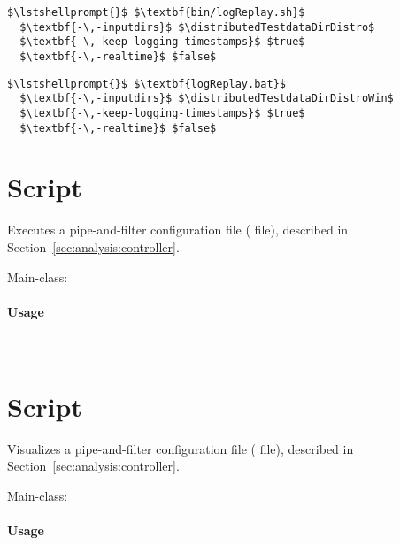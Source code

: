 
\setTextListing
\begin{lstlisting}[caption=Execution under UNIX-like systems]
$\lstshellprompt{}$ $\textbf{bin/logReplay.sh}$
  $\textbf{-\,-inputdirs}$ $\distributedTestdataDirDistro$ 
  $\textbf{-\,-keep-logging-timestamps}$ $true$ 
  $\textbf{-\,-realtime}$ $false$
\end{lstlisting}
\begin{lstlisting}[caption=Execution under Windows]
$\lstshellprompt{}$ $\textbf{logReplay.bat}$
  $\textbf{-\,-inputdirs}$ $\distributedTestdataDirDistroWin$ 
  $\textbf{-\,-keep-logging-timestamps}$ $true$ 
  $\textbf{-\,-realtime}$ $false$
\end{lstlisting}


\section{Script }\label{appendix:wrapperScripts:kaxRun}

Executes a \KickerAnalysisPart{} pipe-and-filter configuration file ( file), %
described in Section~\ref{sec:analysis:controller}. %

\noindent Main-class: {\small {}}

\paragraph*{Usage}\

\setTextListing


\section{Script }\label{appendix:wrapperScripts:kaxViz}

Visualizes a \KickerAnalysisPart{} pipe-and-filter configuration file ( file), %
described in Section~\ref{sec:analysis:controller}. %

\noindent Main-class: {\small {}}

\paragraph*{Usage}\

\setTextListing


